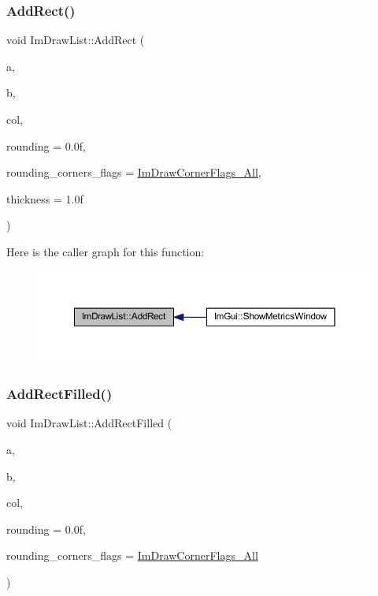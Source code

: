 \subsubsection{\texorpdfstring{Add\+Rect()}{AddRect()}}
{\footnotesize\ttfamily void Im\+Draw\+List\+::\+Add\+Rect (\begin{DoxyParamCaption}\item[{const \mbox{\hyperlink{struct_im_vec2}{Im\+Vec2}} \&}]{a,  }\item[{const \mbox{\hyperlink{struct_im_vec2}{Im\+Vec2}} \&}]{b,  }\item[{\mbox{\hyperlink{imgui_8h_a118cff4eeb8d00e7d07ce3d6460eed36}{Im\+U32}}}]{col,  }\item[{float}]{rounding = {\ttfamily 0.0f},  }\item[{int}]{rounding\+\_\+corners\+\_\+flags = {\ttfamily \mbox{\hyperlink{imgui_8h_ad3b7317312a7b22064ff6b6d00a54258a4e075323857172f48c44c3953f5b03df}{Im\+Draw\+Corner\+Flags\+\_\+\+All}}},  }\item[{float}]{thickness = {\ttfamily 1.0f} }\end{DoxyParamCaption})}

Here is the caller graph for this function\+:
\nopagebreak
\begin{figure}[H]
\begin{center}
\leavevmode
\includegraphics[width=350pt]{struct_im_draw_list_ac4a9baaadd92d203f61c395f6158c7e6_icgraph}
\end{center}
\end{figure}
\mbox{\label{struct_im_draw_list_a6e8b2ae6cc8c905606e4400e4cfdeeeb}} 
\subsubsection{\texorpdfstring{Add\+Rect\+Filled()}{AddRectFilled()}}
{\footnotesize\ttfamily void Im\+Draw\+List\+::\+Add\+Rect\+Filled (\begin{DoxyParamCaption}\item[{const \mbox{\hyperlink{struct_im_vec2}{Im\+Vec2}} \&}]{a,  }\item[{const \mbox{\hyperlink{struct_im_vec2}{Im\+Vec2}} \&}]{b,  }\item[{\mbox{\hyperlink{imgui_8h_a118cff4eeb8d00e7d07ce3d6460eed36}{Im\+U32}}}]{col,  }\item[{float}]{rounding = {\ttfamily 0.0f},  }\item[{int}]{rounding\+\_\+corners\+\_\+flags = {\ttfamily \mbox{\hyperlink{imgui_8h_ad3b7317312a7b22064ff6b6d00a54258a4e075323857172f48c44c3953f5b03df}{Im\+Draw\+Corner\+Flags\+\_\+\+All}}} }\end{DoxyParamCaption})}

